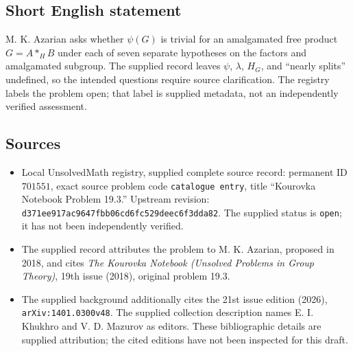 \documentclass[11pt]{article}
\begin{document}
\subsection{Short English statement}
M. K. Azarian asks whether \(\psi(G)\) is trivial for an amalgamated free product \(G=A\ast_H B\) under each of seven separate hypotheses on the factors and amalgamated subgroup. The supplied record leaves \(\psi\), \(\lambda\), \(H_G\), and ``nearly splits'' undefined, so the intended questions require source clarification. The registry labels the problem open; that label is supplied metadata, not an independently verified assessment.
\subsection{Sources}
\begin{itemize}
\item Local UnsolvedMath registry, supplied complete source record: permanent ID \(701551\), exact source problem code \texttt{catalogue entry}, title ``Kourovka Notebook Problem 19.3.'' Upstream revision: \texttt{d371ee917ac9647fbb06cd6fc529deec6f3dda82}. The supplied status is \texttt{open}; it has not been independently verified.
\item The supplied record attributes the problem to M. K. Azarian, proposed in 2018, and cites \emph{The Kourovka Notebook (Unsolved Problems in Group Theory)}, 19th issue (2018), original problem 19.3.
\item The supplied background additionally cites the 21st issue edition (2026), \texttt{arXiv:1401.0300v48}. The supplied collection description names E. I. Khukhro and V. D. Mazurov as editors. These bibliographic details are supplied attribution; the cited editions have not been inspected for this draft.
\end{itemize}
\end{document}
